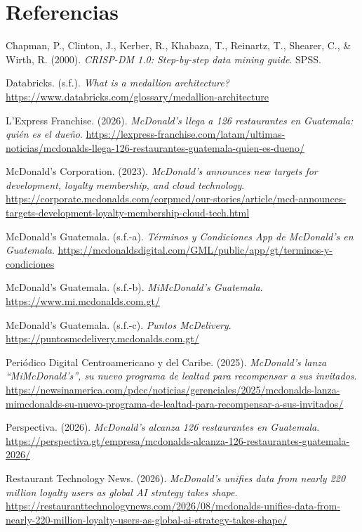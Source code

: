 \documentclass[12pt,a4paper]{article}
\newenvironment{referencias}
  {\begin{list}{}{%
     \setlength{\leftmargin}{1.6em}\setlength{\itemindent}{-1.6em}%
     \setlength{\labelwidth}{0pt}\setlength{\labelsep}{0pt}%
     \setlength{\itemsep}{0.7em}\setlength{\parsep}{0pt}}}
  {\end{list}}
\begin{document}
\section{Referencias}

\begin{referencias}

\item Chapman, P., Clinton, J., Kerber, R., Khabaza, T., Reinartz, T., Shearer, C., \& Wirth, R.
(2000). \emph{CRISP-DM 1.0: Step-by-step data mining guide}. SPSS.

\item Databricks. (s.f.). \emph{What is a medallion architecture?}
\url{https://www.databricks.com/glossary/medallion-architecture}

\item L'Express Franchise. (2026). \emph{McDonald's llega a 126 restaurantes en Guatemala: quién es
el dueño}.
\url{https://lexpress-franchise.com/latam/ultimas-noticias/mcdonalds-llega-126-restaurantes-guatemala-quien-es-dueno/}

\item McDonald's Corporation. (2023). \emph{McDonald's announces new targets for development,
loyalty membership, and cloud technology}.
\url{https://corporate.mcdonalds.com/corpmcd/our-stories/article/mcd-announces-targets-development-loyalty-membership-cloud-tech.html}

\item McDonald's Guatemala. (s.f.-a). \emph{Términos y Condiciones App de McDonald's en
Guatemala}. \url{https://mcdonaldsdigital.com/GML/public/app/gt/terminos-y-condiciones}

\item McDonald's Guatemala. (s.f.-b). \emph{MiMcDonald's Guatemala}.
\url{https://www.mi.mcdonalds.com.gt/}

\item McDonald's Guatemala. (s.f.-c). \emph{Puntos McDelivery}.
\url{https://puntosmcdelivery.mcdonalds.com.gt/}

\item Periódico Digital Centroamericano y del Caribe. (2025). \emph{McDonald's lanza
``MiMcDonald's'', su nuevo programa de lealtad para recompensar a sus invitados}.
\url{https://newsinamerica.com/pdcc/noticias/gerenciales/2025/mcdonalds-lanza-mimcdonalds-su-nuevo-programa-de-lealtad-para-recompensar-a-sus-invitados/}

\item Perspectiva. (2026). \emph{McDonald's alcanza 126 restaurantes en Guatemala}.
\url{https://perspectiva.gt/empresa/mcdonalds-alcanza-126-restaurantes-guatemala-2026/}

\item Restaurant Technology News. (2026). \emph{McDonald's unifies data from nearly 220 million
loyalty users as global AI strategy takes shape}.
\url{https://restauranttechnologynews.com/2026/08/mcdonalds-unifies-data-from-nearly-220-million-loyalty-users-as-global-ai-strategy-takes-shape/}

\end{referencias}
\end{document}
